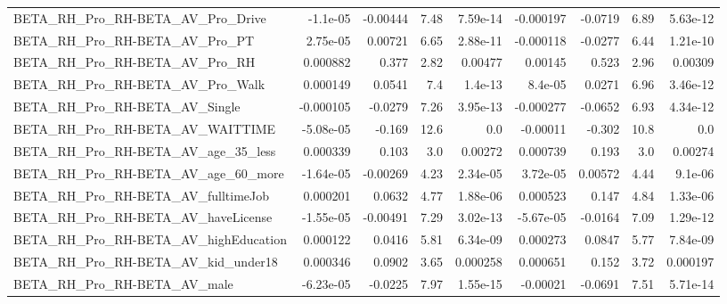 \begin{tabular}{lrrrrrrrr}
BETA\_RH\_Pro\_RH-BETA\_AV\_Pro\_Drive                   &    -1.1e-05 &     -0.00444 &      7.48 & 7.59e-14 &  -0.000197 &     -0.0719 &         6.89 &      5.63e-12 \\
BETA\_RH\_Pro\_RH-BETA\_AV\_Pro\_PT                      &    2.75e-05 &      0.00721 &      6.65 & 2.88e-11 &  -0.000118 &     -0.0277 &         6.44 &      1.21e-10 \\
BETA\_RH\_Pro\_RH-BETA\_AV\_Pro\_RH                      &    0.000882 &        0.377 &      2.82 &  0.00477 &    0.00145 &       0.523 &         2.96 &       0.00309 \\
BETA\_RH\_Pro\_RH-BETA\_AV\_Pro\_Walk                    &    0.000149 &       0.0541 &       7.4 &  1.4e-13 &    8.4e-05 &      0.0271 &         6.96 &      3.46e-12 \\
BETA\_RH\_Pro\_RH-BETA\_AV\_Single                      &   -0.000105 &      -0.0279 &      7.26 & 3.95e-13 &  -0.000277 &     -0.0652 &         6.93 &      4.34e-12 \\
BETA\_RH\_Pro\_RH-BETA\_AV\_WAITTIME                    &   -5.08e-05 &       -0.169 &      12.6 &      0.0 &   -0.00011 &      -0.302 &         10.8 &           0.0 \\
BETA\_RH\_Pro\_RH-BETA\_AV\_age\_35\_less                 &    0.000339 &        0.103 &       3.0 &  0.00272 &   0.000739 &       0.193 &          3.0 &       0.00274 \\
BETA\_RH\_Pro\_RH-BETA\_AV\_age\_60\_more                 &   -1.64e-05 &     -0.00269 &      4.23 & 2.34e-05 &   3.72e-05 &     0.00572 &         4.44 &       9.1e-06 \\
BETA\_RH\_Pro\_RH-BETA\_AV\_fulltimeJob                 &    0.000201 &       0.0632 &      4.77 & 1.88e-06 &   0.000523 &       0.147 &         4.84 &      1.33e-06 \\
BETA\_RH\_Pro\_RH-BETA\_AV\_haveLicense                 &   -1.55e-05 &     -0.00491 &      7.29 & 3.02e-13 &  -5.67e-05 &     -0.0164 &         7.09 &      1.29e-12 \\
BETA\_RH\_Pro\_RH-BETA\_AV\_highEducation               &    0.000122 &       0.0416 &      5.81 & 6.34e-09 &   0.000273 &      0.0847 &         5.77 &      7.84e-09 \\
BETA\_RH\_Pro\_RH-BETA\_AV\_kid\_under18                 &    0.000346 &       0.0902 &      3.65 & 0.000258 &   0.000651 &       0.152 &         3.72 &      0.000197 \\
BETA\_RH\_Pro\_RH-BETA\_AV\_male                        &   -6.23e-05 &      -0.0225 &      7.97 & 1.55e-15 &   -0.00021 &     -0.0691 &         7.51 &      5.71e-14 \\

\end{tabular}
